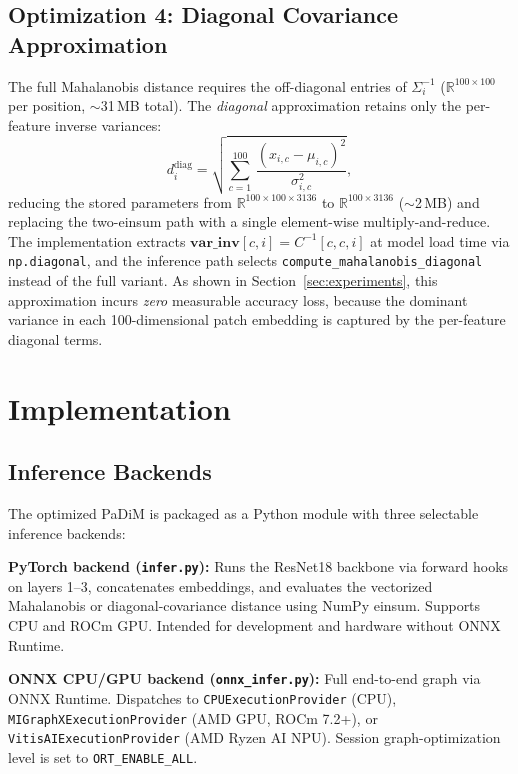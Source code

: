\documentclass[blind]{gtac}
\begin{document}
\subsection{Optimization 4: Diagonal Covariance Approximation}

The full Mahalanobis distance requires the off-diagonal entries of
$\Sigma_i^{-1}$ ($\mathbb{R}^{100\times100}$ per position,
$\sim$31\,MB total).  The \emph{diagonal} approximation retains only the
per-feature inverse variances:
%
\begin{equation}
  d_i^{\mathrm{diag}}
  = \sqrt{\sum_{c=1}^{100}\, \frac{(x_{i,c} - \mu_{i,c})^2}{\sigma_{i,c}^2}},
  \label{eq:diag}
\end{equation}
%
reducing the stored parameters from $\mathbb{R}^{100\times100\times3136}$ to
$\mathbb{R}^{100\times3136}$ ($\sim$2\,MB) and replacing the two-einsum path
with a single element-wise multiply-and-reduce.  The implementation extracts
$\mathbf{var\_inv}[c,i] = C^{-1}[c,c,i]$ at model load time via
\texttt{np.diagonal}, and the inference path selects
\texttt{compute\_mahalanobis\_diagonal} instead of the full variant.  As
shown in Section~\ref{sec:experiments}, this approximation incurs \emph{zero}
measurable accuracy loss, because the dominant variance in each 100-dimensional
patch embedding is captured by the per-feature diagonal terms.

\section{Implementation}
\label{sec:implementation}

\subsection{Inference Backends}

The optimized PaDiM is packaged as a Python module with three selectable
inference backends:

\textbf{PyTorch backend (\texttt{infer.py}):}  Runs the ResNet18 backbone via
forward hooks on layers 1--3, concatenates embeddings, and evaluates the
vectorized Mahalanobis or diagonal-covariance distance using NumPy einsum.
Supports CPU and ROCm GPU.  Intended for development and hardware without
ONNX Runtime.

\textbf{ONNX CPU/GPU backend (\texttt{onnx\_infer.py}):}  Full end-to-end
graph via ONNX Runtime.  Dispatches to \texttt{CPUExecutionProvider} (CPU),
\texttt{MIGraphXExecutionProvider} (AMD GPU, ROCm 7.2+), or
\texttt{VitisAIExecutionProvider} (AMD Ryzen AI NPU).  Session graph-optimization
level is set to \texttt{ORT\_ENABLE\_ALL}.
\end{document}
